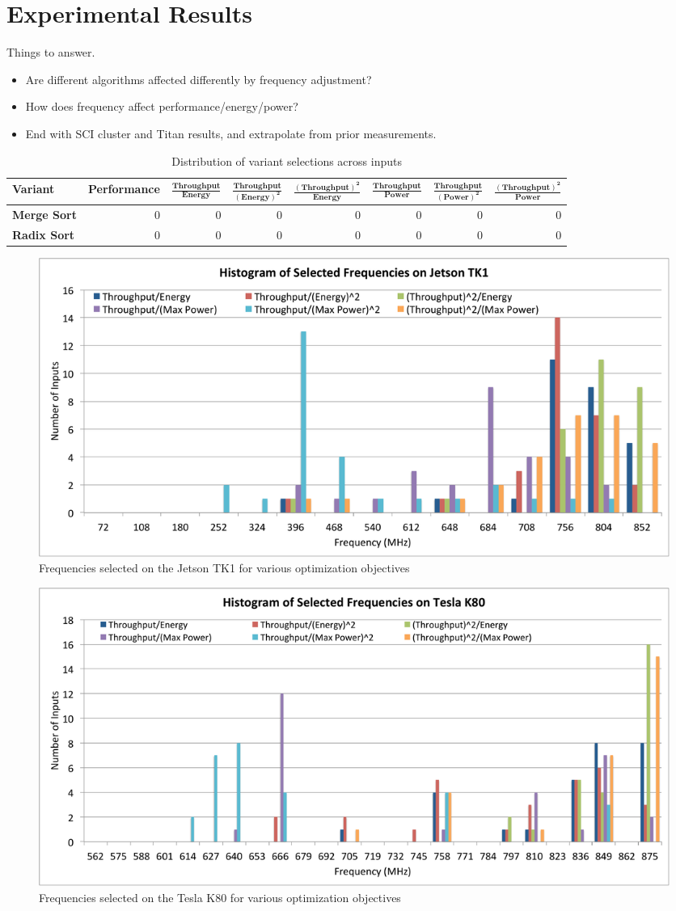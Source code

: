 \section{Experimental Results}

{\color{red} Things to answer.}
\begin{itemize}
\item Are different algorithms affected differently by frequency adjustment?
\item How does frequency affect performance/energy/power?
\item End with SCI cluster and Titan results, and extrapolate from prior 
measurements.
\end{itemize}


\begin{table}[tb]
  \begin{center}
  \begin{tabular}{| l | r | r | r | r | r | r | r |}
  \hline
  \textbf{Variant} & \textbf{Performance} & $\mathbf{\frac{Throughput}{Energy}}$ & $\mathbf{\frac{Throughput}{(Energy)^2}}$ & $\mathbf{\frac{(Throughput)^2}{Energy}}$ & $\mathbf{\frac{Throughput}{Power}}$ & $\mathbf{\frac{Throughput}{(Power)^2}}$ & $\mathbf{\frac{(Throughput)^2}{Power}}$ \\ \hline
  \textbf{Merge Sort} & 0 & 0 & 0 & 0 & 0 & 0 & 0 \\ \hline
  \textbf{Radix Sort} & 0 & 0 & 0 & 0 & 0 & 0 & 0 \\ \hline
  \end{tabular}
  \end{center}
  \caption{Distribution of variant selections across inputs}
  \label{tab:ss}
\end{table}

\begin{figure}[tb]
   \centering
   \includegraphics[scale=0.4]{figs/histo_tk1.pdf}
   \caption{Frequencies selected on the Jetson TK1 for various optimization objectives}
   \label{fig:histo-tk1}
\end{figure}

\begin{figure}[tb]
   \centering
   \includegraphics[scale=0.4]{figs/histo_k80.pdf}
   \caption{Frequencies selected on the Tesla K80 for various optimization objectives}
   \label{fig:histo-k80}
\end{figure}
